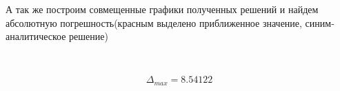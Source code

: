 \documentclass[14pt,a4paper]{scrartcl}
\begin{document}
А так же построим совмещенные графики полученных решений и найдем абсолютную погрешность(красным выделено приближенное значение, синим-аналитическое решение)


\begin{figure}[H]
	\begin{minipage}[h]{1\linewidth}
		  \\
	\end{minipage}
\end{figure}

\begin{equation*}
	\Delta_{max} = 8.54122
\end{equation*}
\end{document}
